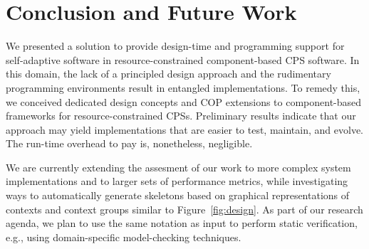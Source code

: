 \section{Conclusion and Future Work}
\label{sec:ending}

We presented a solution to provide design-time and programming support
for self-adaptive software in re\-sour\-ce-constrained component-based
CPS software. In this domain, the lack of a principled design approach
and the rudimentary programming environments result in entangled
implementations. To remedy this, we conceived dedicated design
concepts and COP extensions to component-based frameworks for
resource-constrained CPSs. Preliminary results indicate that our
approach may yield implementations that are easier to test, maintain, and
evolve. The run-time overhead to pay is, nonetheless, negligible.



We are currently extending the assesment of our work to more complex
system implementations and to larger sets of performance metrics, while
investigating ways to automatically generate \conesc skeletons based
on graphical representations of contexts and context groups similar to
Figure~\ref{fig:design}.  As part of our research agenda, we plan to
use the same notation as input to perform static verification, e.g.,
using domain-specific model-checking techniques.

